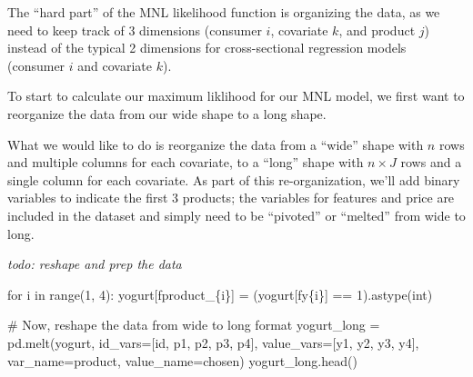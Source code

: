 \documentclass[
  letterpaper,
  DIV=11,
  numbers=noendperiod]{scrartcl}
\newenvironment{Shaded}{\begin{snugshade}}{\end{snugshade}}
\newcommand{\BuiltInTok}[1]{\textcolor[rgb]{0.00,0.23,0.31}{#1}}
\newcommand{\CommentTok}[1]{\textcolor[rgb]{0.37,0.37,0.37}{#1}}
\newcommand{\ControlFlowTok}[1]{\textcolor[rgb]{0.00,0.23,0.31}{#1}}
\newcommand{\DecValTok}[1]{\textcolor[rgb]{0.68,0.00,0.00}{#1}}
\newcommand{\KeywordTok}[1]{\textcolor[rgb]{0.00,0.23,0.31}{#1}}
\newcommand{\NormalTok}[1]{\textcolor[rgb]{0.00,0.23,0.31}{#1}}
\newcommand{\OperatorTok}[1]{\textcolor[rgb]{0.37,0.37,0.37}{#1}}
\newcommand{\SpecialCharTok}[1]{\textcolor[rgb]{0.37,0.37,0.37}{#1}}
\newcommand{\SpecialStringTok}[1]{\textcolor[rgb]{0.13,0.47,0.30}{#1}}
\newcommand{\StringTok}[1]{\textcolor[rgb]{0.13,0.47,0.30}{#1}}
\begin{document}
The ``hard part'' of the MNL likelihood function is organizing the data,
as we need to keep track of 3 dimensions (consumer \(i\), covariate
\(k\), and product \(j\)) instead of the typical 2 dimensions for
cross-sectional regression models (consumer \(i\) and covariate \(k\)).

To start to calculate our maximum liklihood for our MNL model, we first
want to reorganize the data from our wide shape to a long shape.

What we would like to do is reorganize the data from a ``wide'' shape
with \(n\) rows and multiple columns for each covariate, to a ``long''
shape with \(n \times J\) rows and a single column for each covariate.
As part of this re-organization, we'll add binary variables to indicate
the first 3 products; the variables for features and price are included
in the dataset and simply need to be ``pivoted'' or ``melted'' from wide
to long.

\emph{todo: reshape and prep the data}

\begin{Shaded}
\begin{Highlighting}[]
\ControlFlowTok{for}\NormalTok{ i }\KeywordTok{in} \BuiltInTok{range}\NormalTok{(}\DecValTok{1}\NormalTok{, }\DecValTok{4}\NormalTok{):}
\NormalTok{    yogurt[}\SpecialStringTok{f\textquotesingle{}product\_}\SpecialCharTok{\{}\NormalTok{i}\SpecialCharTok{\}}\SpecialStringTok{\textquotesingle{}}\NormalTok{] }\OperatorTok{=}\NormalTok{ (yogurt[}\SpecialStringTok{f\textquotesingle{}y}\SpecialCharTok{\{}\NormalTok{i}\SpecialCharTok{\}}\SpecialStringTok{\textquotesingle{}}\NormalTok{] }\OperatorTok{==} \DecValTok{1}\NormalTok{).astype(}\BuiltInTok{int}\NormalTok{)}

\CommentTok{\# Now, reshape the data from wide to long format}
\NormalTok{yogurt\_long }\OperatorTok{=}\NormalTok{ pd.melt(yogurt, id\_vars}\OperatorTok{=}\NormalTok{[}\StringTok{\textquotesingle{}id\textquotesingle{}}\NormalTok{, }\StringTok{\textquotesingle{}p1\textquotesingle{}}\NormalTok{, }\StringTok{\textquotesingle{}p2\textquotesingle{}}\NormalTok{, }\StringTok{\textquotesingle{}p3\textquotesingle{}}\NormalTok{, }\StringTok{\textquotesingle{}p4\textquotesingle{}}\NormalTok{], }
\NormalTok{                  value\_vars}\OperatorTok{=}\NormalTok{[}\StringTok{\textquotesingle{}y1\textquotesingle{}}\NormalTok{, }\StringTok{\textquotesingle{}y2\textquotesingle{}}\NormalTok{, }\StringTok{\textquotesingle{}y3\textquotesingle{}}\NormalTok{, }\StringTok{\textquotesingle{}y4\textquotesingle{}}\NormalTok{], }
\NormalTok{                  var\_name}\OperatorTok{=}\StringTok{\textquotesingle{}product\textquotesingle{}}\NormalTok{, value\_name}\OperatorTok{=}\StringTok{\textquotesingle{}chosen\textquotesingle{}}\NormalTok{)}
\NormalTok{yogurt\_long.head()}
\end{Highlighting}
\end{Shaded}
\end{document}
